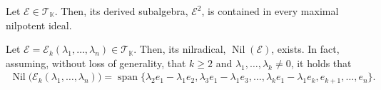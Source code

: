 \documentclass[10pt,a4paper]{amsart}
\DeclareMathOperator{\nil}{Nil}
\DeclareMathOperator{\spa}{span}
\begin{document}
\begin{lemma}\label{lem:lem1}
	Let $\mathcal{E}\in\mathcal{T}_\mathbb{K}$. Then, its derived subalgebra, $\mathcal{E}^2$, is contained in every maximal nilpotent ideal.
\end{lemma}

\begin{theorem}\label{th:nilrad_dim1}
	Let $\mathcal{E}=\mathcal{E}_k(\lambda_1,\dots,\lambda_n)\in\mathcal{T}_\mathbb{K}$. Then, its nilradical, $\nil(\mathcal{E})$, exists. In fact, assuming, without loss of generality, that $k\geq2$ and $\lambda_1,\dots,\lambda_k\neq0$, it holds that
	\begin{align*}
	\nil\big(\mathcal{E}_k(\lambda_1,\dots,\lambda_n)\big)=\spa\{\lambda_2e_1-\lambda_1e_2,\lambda_3e_1-\lambda_1e_3,\dots,\lambda_ke_1-\lambda_1e_k,e_{k+1},\dots,e_n\}.
	\end{align*}
\end{theorem}
\end{document}
